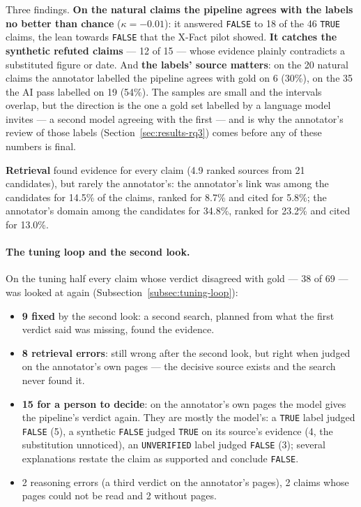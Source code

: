 Three findings. \textbf{On the natural claims the pipeline agrees with
the labels no better than chance} ($\kappa = -0.01$): it answered
\texttt{FALSE} to 18 of the 46 \texttt{TRUE} claims, the lean towards
\texttt{FALSE} that the X-Fact pilot showed. \textbf{It catches the
synthetic refuted claims} --- 12 of 15 --- whose evidence plainly
contradicts a substituted figure or date. And \textbf{the labels' source
matters}: on the 20 natural claims the annotator labelled the pipeline
agrees with gold on 6 (30\%), on the 35 the AI pass labelled on 19
(54\%). The samples are small and the intervals overlap, but the
direction is the one a gold set labelled by a language model invites
--- a second model agreeing with the first --- and is why the
annotator's review of those labels (Section~\ref{sec:results-rq3})
comes before any of these numbers is final.

\textbf{Retrieval} found evidence for every claim (4.9 ranked sources
from 21 candidates), but rarely the annotator's: the annotator's link
was among the candidates for 14.5\% of the claims, ranked for 8.7\% and
cited for 5.8\%; the annotator's domain among the candidates for 34.8\%,
ranked for 23.2\% and cited for 13.0\%.

\paragraph{The tuning loop and the second look.} On the tuning half
every claim whose verdict disagreed with gold --- 38 of 69 --- was
looked at again (Subsection~\ref{subsec:tuning-loop}):

\begin{itemize}
    \item \textbf{9 fixed} by the second look: a second search, planned
    from what the first verdict said was missing, found the evidence.
    \item \textbf{8 retrieval errors}: still wrong after the second look,
    but right when judged on the annotator's own pages --- the decisive
    source exists and the search never found it.
    \item \textbf{15 for a person to decide}: on the annotator's own
    pages the model gives the pipeline's verdict again. They are mostly
    the model's: a \texttt{TRUE} label judged \texttt{FALSE} (5), a
    synthetic \texttt{FALSE} judged \texttt{TRUE} on its source's
    evidence (4, the substitution unnoticed), an \texttt{UNVERIFIED}
    label judged \texttt{FALSE} (3); several explanations restate the
    claim as supported and conclude \texttt{FALSE}.
    \item 2 reasoning errors (a third verdict on the annotator's pages),
    2 claims whose pages could not be read and 2 without pages.
\end{itemize}

